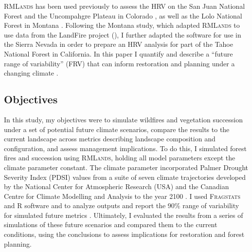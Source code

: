 \textsc{RMLands} has been used previously to assess the HRV on the San Juan National Forest and the Uncompahgre Plateau in Colorado \citep{McGarigal2005,McGarigal2005a,Romme2009}, as well as the Lolo National Forest in Montana \citep{Cushman2011}. Following the Montana study, which adapted \textsc{RMLands} to use data from the LandFire project (), I further adapted the software for use in the Sierra Nevada in order to prepare an HRV analysis for part of the Tahoe National Forest in California. In this paper I quantify and describe a ``future range of variability'' (FRV) that can inform restoration and planning under a changing climate \citep{Fule2008,Duncan2010}.


\subsection{Objectives}
In this study, my objectives were to simulate wildfires and vegetation succession under a set of potential future climate scenarios, compare the results to the current landscape across metrics describing landscape composition and configuration, and assess management implications. To do this, I simulated forest fires and succession using \textsc{RMLands}, holding all model parameters except the climate parameter constant. The climate parameter incorporated Palmer Drought Severity Index (PDSI) values from a suite of seven climate trajectories developed by the National Center for Atmospheric Research (USA) and the Canadian Centre for Climate Modelling and Analysis to the year 2100 \citep{Cook2014}. I used \textsc{Fragstats} and R software and to analyze outputs and report the 90\% range of variability for simulated future metrics \citep{Fragstats2012,RCoreTeam2013}. Ultimately, I evaluated the results from a series of simulations of these future scenarios and compared them to the current conditions, using the conclusions to assess implications for restoration and forest planning.










